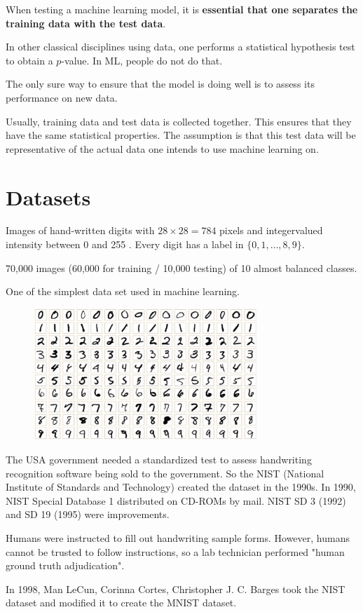 \documentclass{report}
\begin{document}
\begin{concept}
    When testing a machine learning model, it is \textbf{essential that one separates the training data with the test data}.

    In other classical disciplines using data, one performs a statistical hypothesis test to obtain a $p$-value. In ML, people do not do that.

    The only sure way to ensure that the model is doing well is to assess its performance on new data.

    Usually, training data and test data is collected together. This ensures that they have the same statistical properties. The assumption is that this test data will be representative of the actual data one intends to use machine learning on.
\end{concept}

\section{Datasets}

\begin{concept}[3.20][MNIST]
    Images of hand-written digits with $28 \times 28=784$ pixels and integervalued intensity between 0 and 255 . Every digit has a label in $\{0,1, \ldots, 8,9\}$.

    70,000 images (60,000 for training / 10,000 testing) of 10 almost balanced classes.

    One of the simplest data set used in machine learning.

    \begin{figure}[H]
        \centering
        \includegraphics[width=0.75\textwidth]{.././assets/3.3.png}
    \end{figure}

    The USA government needed a standardized test to assess handwriting recognition software being sold to the government. So the NIST (National Institute of Standards and Technology) created the dataset in the 1990s. In 1990, NIST Special Database 1 distributed on CD-ROMs by mail. NIST SD 3 (1992) and SD 19 (1995) were improvements.

    Humans were instructed to fill out handwriting sample forms. However, humans cannot be trusted to follow instructions, so a lab technician performed "human ground truth adjudication".

    In 1998, Man LeCun, Corinna Cortes, Christopher J. C. Barges took the NIST dataset and modified it to create the MNIST dataset.
\end{concept}
\end{document}
